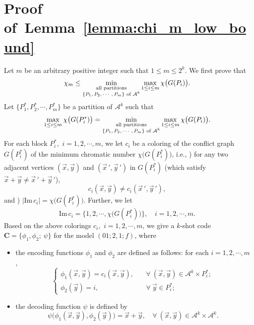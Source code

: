 \documentclass[11pt,draftclsnofoot,onecolumn]{IEEEtran}
\newcommand{\rmnum}[1]{\romannumeral #1}
\newcommand{\mbC}{\mathbf{C}}
\def\Im{\mathrm{Im}}
\begin{document}

\appendices

\section{Proof of~Lemma~\ref{lemma:chi_m_low_bound}}\label{append-lemma:chi_m_low_bound}

Let $m$ be an arbitrary positive integer such that $1\leq m\leq 2^k$.
We first prove that
\begin{equation}\label{cor:chi_m=min_max_color}
	\chi_{m}\leq\min_{\substack{\text{ \rm{all partitions} }\\\text{$\{P_1,P_2,\cdots,P_m\}$ \rm{of} $\mathcal{A}^{k}$}}}\max_{1\leq i\leq m}\chi\big(G(P_i)\big).
\end{equation}
Let $\big\{P^*_1,P^*_2,\cdots,P^*_m\big\}$ be a partition of $\mathcal{A}^{k}$ such that
 \begin{equation}\label{cor:chi_m-min_max_color-eq1}
	\max_{1\leq i\leq m}\chi\big(G(P^*_i)\big)=\min_{\substack{\text{ \rm{all partitions} }\\\text{$\{P_1,P_2,\cdots,P_m\}$ \rm{of} $\mathcal{A}^{k}$}}}\max_{1\leq i\leq m}\chi\big(G(P_i)\big).
\end{equation}
For each block $P_i^*,$ $i=1,2,\cdots,m$, we let $c_i$ be a coloring of the conflict graph $G(P_i^*)$ of the
minimum chromatic number $\chi\big(G(P_i^*)\big)$, i.e., \rmnum{1})
for any two adjacent vertices
$(\vec{x},\vec{y})$ and $(\vec{x}\,',\vec{y}\,')$ in $G(P^*_i)$ (which satisfy $\vec{x}+\vec{y}\neq \vec{x}\,'+\vec{y}\,'$),
\begin{equation}
c_i(\vec{x},\vec{y})\neq c_i(\vec{x}\,',\vec{y}\,'), \label{G(P_i)-Color-c_i}
\end{equation}
and \rmnum{2}) $|\Im\,c_i|=\chi\big(G(P_i^*)\big)$.
Further, we let
 \begin{equation} \Im\,c_i=\big\{1,2,\cdots,\chi\big(G(P^*_i)\big)\big\},\quad i=1,2,\cdots,m.\label{cor:chi_m-min_max_color-eq2}
  \end{equation}
Based on the above colorings $c_i,$ $i=1,2,\cdots,m$, we give a $k$-shot code $\mbC=\big\{\phi_1,\phi_2;~\psi\big\}$ for the model $(01;2,1;f)$, where
\begin{itemize}
\item the encoding functions $\phi_1$ and $\phi_2$ are defined as follows: for each $i=1,2,\cdots,m$,
\begin{equation}
\begin{cases}
\phi_1(\vec{x},\vec{y})=c_i(\vec{x},\vec{y}),\quad&\forall~(\vec{x},\vec{y})\in\mathcal{A}^k\times P^*_i;\\
\phi_2(\vec{y})=i,\quad&\forall~\vec{y}\in P^*_i;
\end{cases}\label{phi-1,2-constr}
\end{equation}
\item the decoding function $\psi$ is defined by
\begin{equation*}
\psi\big(\phi_1(\vec{x},\vec{y}),\phi_2(\vec{y})\big)=\vec{x}+\vec{y},\quad\forall~(\vec{x},\vec{y})\in
\mathcal{A}^k\times\mathcal{A}^k.
\end{equation*}
\end{itemize}
\end{document}
